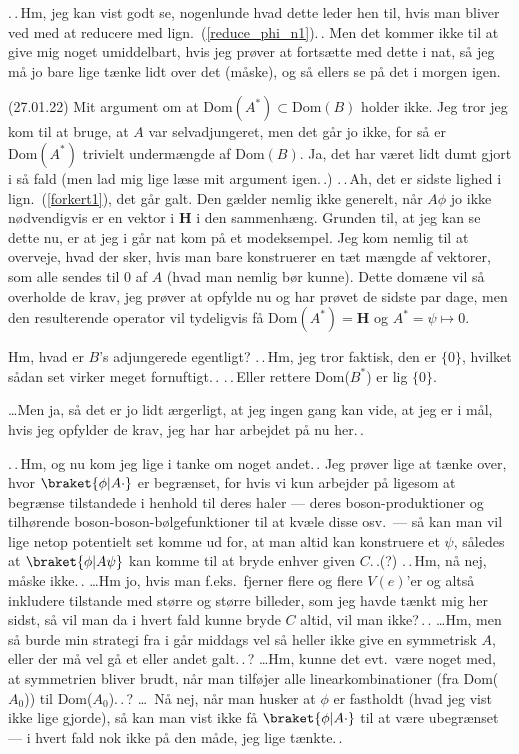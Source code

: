 \documentclass{report}
\begin{document}
.\,.\,Hm, jeg kan vist godt se, nogenlunde hvad dette leder hen til, hvis man bliver ved med at reducere med lign.\ (\ref{reduce_phi_n1}).\,. Men det kommer ikke til at give mig noget umiddelbart, hvis jeg prøver at fortsætte med dette i nat, så jeg må jo bare lige tænke lidt over det (måske), og så ellers se på det i morgen igen. 


(27.01.22) Mit argument om at $\mathrm{Dom}(A^*) \subset \mathrm{Dom}(B)$ holder ikke. Jeg tror jeg kom til at bruge, at $A$ var selvadjungeret, men det går jo ikke, for så er $\mathrm{Dom}(A^*)$ trivielt undermængde af $\mathrm{Dom}(B)$. Ja, det har været lidt dumt gjort i så fald (men lad mig lige læse mit argument igen.\,.) .\,.\,Ah, det er sidste lighed i lign.\ (\ref{forkert1}), det går galt. Den gælder nemlig ikke generelt, når $A\phi$ jo ikke nødvendigvis er en vektor i \textbf{H} i den sammenhæng. Grunden til, at jeg kan se dette nu, er at jeg i går nat kom på et modeksempel. Jeg kom nemlig til at overveje, hvad der sker, hvis man bare konstruerer en tæt mængde af vektorer, som alle sendes til 0 af $A$ (hvad man nemlig bør kunne). Dette domæne vil så overholde de krav, jeg prøver at opfylde nu og har prøvet de sidste par dage, men den resulterende operator vil tydeligvis få $\mathrm{Dom}(A^*) = \mathrm{\textbf{H}}$ og $A^* = \psi \mapsto 0$. 

Hm, hvad er $B$'s adjungerede egentligt? .\,.\,Hm, jeg tror faktisk, den er $\{0\}$, hvilket sådan set virker meget fornuftigt.\,. .\,.\,Eller rettere Dom($B^*$) er lig $\{0\}$.

\ldots Men ja, så det er jo lidt ærgerligt, at jeg ingen gang kan vide, at jeg er i mål, hvis jeg opfylder de krav, jeg har har arbejdet på nu her.\,. 


.\,.\,Hm, og nu kom jeg lige i tanke om noget andet.\,. Jeg prøver lige at tænke over, hvor $\braket{\phi | A \cdot}$ er begrænset, for hvis vi kun arbejder på ligesom at begrænse tilstandede i henhold til deres haler --- deres boson-produktioner og tilhørende boson-boson-bølgefunktioner til at kvæle disse osv.\ --- så kan man vil lige netop potentielt set komme ud for, at man altid kan konstruere et $\psi$, således at $\braket{\phi | A \psi}$ kan komme til at bryde enhver given $C$.\,.(?) .\,.\,Hm, nå nej, måske ikke.\,. \ldots Hm jo, hvis man f.eks.\ fjerner flere og flere $V(e)$'er og altså inkludere tilstande med større og større billeder, som jeg havde tænkt mig her sidst, så vil man da i hvert fald kunne bryde $C$ altid, vil man ikke?\,.\,. \ldots Hm, men så burde min strategi fra i går middags vel så heller ikke give en symmetrisk $A$, eller der må vel gå et eller andet galt.\,.\,? \ldots Hm, kunne det evt.\ være noget med, at symmetrien bliver brudt, når man tilføjer alle linearkombinationer (fra Dom($A_0$)) til Dom($A_0$).\,.\,?
\ldots\ Nå nej, når man husker at $\phi$ er fastholdt (hvad jeg vist ikke lige gjorde), så kan man vist ikke få $\braket{\phi | A \cdot}$ til at være ubegrænset --- i hvert fald nok ikke på den måde, jeg lige tænkte.\,. 
\end{document}
